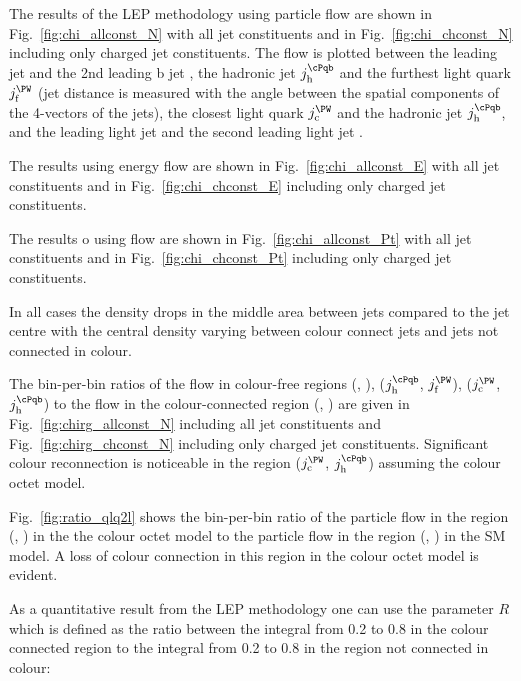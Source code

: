 The results of the LEP methodology using particle flow are shown in Fig.~\ref{fig:chi_allconst_N} with all jet constituents and in Fig.~\ref{fig:chi_chconst_N} including only charged jet constituents. The flow is plotted between the leading \cPqb jet \leadingb and the 2nd leading b jet \scndleadingb, the hadronic \cPqb jet $j_{\text{h}}^{\cPqb}$ and the furthest light quark $j_{\text{f}}^{\PW}$ (jet distance is measured with the angle between the spatial components of the 4-vectors of the jets), the closest light quark $j_{\text{c}}^{\PW}$ and the hadronic \cPqb jet $j_{\text{h}}^{\cPqb}$, and the leading light jet \leadingjet and the second leading light jet \scndleadingjet.

The results using energy flow are shown in Fig.~\ref{fig:chi_allconst_E} with all jet constituents and in Fig.~\ref{fig:chi_chconst_E} including only charged jet constituents.

The results o using \pt flow are shown in Fig.~\ref{fig:chi_allconst_Pt} with all jet constituents and in Fig.~\ref{fig:chi_chconst_Pt} including only charged jet constituents.

In all cases the density drops in the middle area between jets compared to the jet centre with the central density varying between colour connect jets and jets not connected in colour.

The bin-per-bin ratios of the flow in colour-free regions (\leadingb, \scndleadingb), ($j_{\text{h}}^{\cPqb}$, $j_{\text{f}}^{\PW}$), ($j_{\text{c}}^{\PW}$, $j_{\text{h}}^{\cPqb}$) to the flow in the colour-connected region (\leadingjet, \scndleadingjet) are given in Fig.~\ref{fig:chirg_allconst_N} including all jet constituents and Fig.~\ref{fig:chirg_chconst_N} including only charged jet constituents. Significant colour reconnection is noticeable in the region ($j_{\text{c}}^{\PW}$, $j_{\text{h}}^{\cPqb}$) assuming the colour octet \PW model.

Fig.~\ref{fig:ratio_qlq2l} shows the bin-per-bin ratio of the particle flow in the region (\leadingjet, \scndleadingjet) in the the colour octet \PW model to the particle flow in the region (\leadingjet, \scndleadingjet) in the SM model. A loss of colour connection in this region in the colour octet \PW model is evident.

As a quantitative result from the LEP methodology one can use the parameter $R$ which is defined as the ratio between the integral from 0.2 to 0.8 in the colour connected region to the integral from 0.2 to 0.8 in the region not connected in colour:

